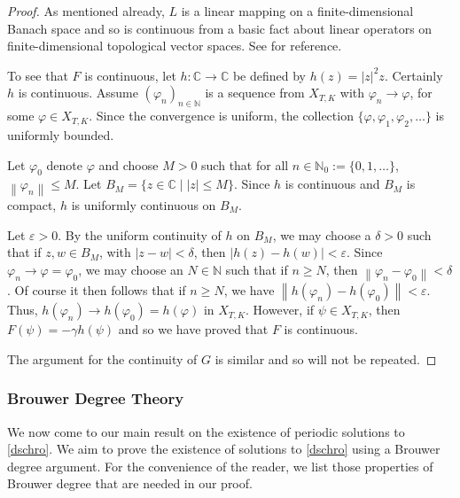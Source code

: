 \documentclass[10pt,a4paper]{amsart}
\newcommand{\N}{\mathbb{N}}
\newcommand{\C}{\mathbb{C}}
\newcommand{\norm}[1]{\left \lVert #1 \right \rVert}
\newcommand{\ve}{\varepsilon}
\renewcommand{\phi}{\varphi}
\newcommand{\seqn}[1]{(#1)_{n\in \N}}
\numberwithin{equation}{section}
\begin{document}
\begin{proof}
As mentioned already, $L$ is a linear mapping on a finite-dimensional Banach space and so is continuous from a basic fact about linear operators on finite-dimensional topological vector spaces. See \cite{ConwayCA} for reference.

To see that $F$ is continuous, let $h:\C\to \C$ be defined by $h(z)=|z|^2z$.  Certainly $h$ is continuous.  Assume $\seqn{\phi_n}$ is a sequence from $X_{T,K}$ with $\phi_n\to \phi$, for some $\phi\in X_{T,K}$.  Since the convergence is uniform, the collection $\{\phi, \phi_1, \phi_2, \dots\}$ is uniformly bounded.

Let $\phi_0$ denote $\phi$ and choose $M>0$ such that for all $n\in \N_0:=\{0, 1, \dots\}$, $\norm{\phi_n}\leq M$. Let $B_M=\{z\in \C\mid |z|\leq M\}$.  Since $h$ is continuous and $B_M$ is compact, $h$ is uniformly continuous on $B_M$.

Let $\ve>0$. By the uniform continuity of $h$ on $B_M$, we may choose a $\delta>0$ such that if $z, w\in B_M$, with $|z-w|<\delta$, then $|h(z)-h(w)|<\ve$.  Since $\phi_n\to \phi=\phi_0$, we may choose an $N\in \N$ such that if $n\geq N$, then $\norm{\phi_n-\phi_0}<\delta$.  Of course it then follows that if $n\geq N$, we have $\norm{h(\phi_n)-h(\phi_0)}<\ve$.  Thus, $h(\phi_n)\to h(\phi_0)=h(\phi)$ in $X_{T,K}$. However, if $\psi\in X_{T,K}$, then $F(\psi)=-\gamma h(\psi)$ and so we have proved that $F$ is continuous.  

The argument for the continuity of $G$ is similar and so will not be repeated.
\end{proof}

\subsubsection{Brouwer Degree Theory} 
We now come to our main result on the existence of periodic solutions to \eqref{dschro}. We aim to prove the existence of solutions to \eqref{dschro} using a Brouwer degree argument.  For the convenience of the reader, we list those properties of Brouwer degree that are needed in our proof.  
\end{document}
